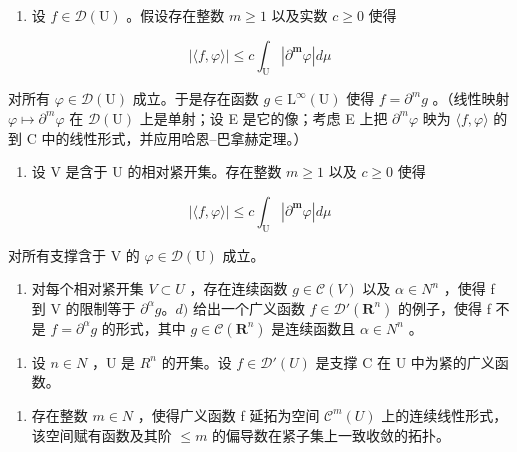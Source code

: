 \begin{enumerate}
\def\labelenumi{\alph{enumi})}
\tightlist
\item
  设 \(f \in \mathcal{D}(\mathrm{U})\) 。假设存在整数 \(m \geqslant 1\) 以及实数 \(c \geqslant 0\) 使得
\end{enumerate}

\[
| \langle f, \varphi \rangle | \leqslant c \int_ {\mathrm{U}} | \partial^ {\boldsymbol {m}} \varphi | d \mu
\]

对所有 \(\varphi\in\mathcal{D}(\mathrm{U})\) 成立。于是存在函数 \(g\in\mathrm{L}^{\infty}(\mathrm{U})\) 使得 \(f=\partial^{m}g\) 。（线性映射 \(\varphi\mapsto\partial^{m}\varphi\) 在 \(\mathcal{D}(\mathrm{U})\) 上是单射；设 E 是它的像；考虑 E 上把 \(\partial^{m}\varphi\) 映为 \(\langle f,\varphi\rangle\) 的到 C 中的线性形式，并应用哈恩–巴拿赫定理。）

\begin{enumerate}
\def\labelenumi{\alph{enumi})}
\setcounter{enumi}{1}
\tightlist
\item
  设 V 是含于 U 的相对紧开集。存在整数 \(m \geqslant 1\) 以及 \(c \geqslant 0\) 使得
\end{enumerate}

\[
| \langle f, \varphi \rangle | \leqslant c \int_ {\mathrm{U}} | \partial^ {\boldsymbol {m}} \varphi | d \mu
\]

对所有支撑含于 V 的 \(\varphi\in\mathcal{D}(\mathrm{U})\) 成立。

\begin{enumerate}
\def\labelenumi{\alph{enumi})}
\setcounter{enumi}{2}
\tightlist
\item
  对每个相对紧开集 \(V \subset U\) ，存在连续函数 \(g \in \mathcal{C}(V)\) 以及 \(\alpha \in N^{n}\) ，使得 f 到 V 的限制等于 \(\partial^{\alpha}g\)。\(d)\) 给出一个广义函数 \(f \in \mathcal{D}'(\mathbf{R}^{n})\) 的例子，使得 f 不是 \(f = \partial^{\alpha}g\) 的形式，其中 \(g \in \mathcal{C}(\mathbf{R}^{n})\) 是连续函数且 \(\alpha \in N^{n}\) 。
\end{enumerate}

\begin{enumerate}
\def\labelenumi{\arabic{enumi})}
\setcounter{enumi}{23}
\tightlist
\item
  设 \(n \in N\) ，U 是 \(R^{n}\) 的开集。设 \(f \in \mathcal{D}'(U)\) 是支撑 C 在 U 中为紧的广义函数。
\end{enumerate}

\begin{enumerate}
\def\labelenumi{\alph{enumi})}
\tightlist
\item
  存在整数 \(m \in N\) ，使得广义函数 f 延拓为空间 \(\mathcal{C}^{m}(U)\) 上的连续线性形式，该空间赋有函数及其阶 \(\leqslant m\) 的偏导数在紧子集上一致收敛的拓扑。
\end{enumerate}

